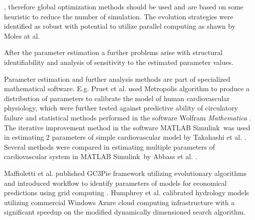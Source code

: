  , therefore global optimization methods should be used and are based on some heuristic to reduce the number of simulation. The evolution strategies were identified as robust with potential to utilize parallel computing as shawn by Moles at al.\cite{Moles2003}

After the parameter estimation a further problems arise with structural identifiability and analysis of sensitivity to the estimated parameter values\cite[p.~176]{khoo2000}. 

Parameter estimation and further analysis methods are part of specialized mathematical software. E.g. Pruet et al. used Metropolis algorithm to produce a distribution of parameters to calibrate the model of human cardiovascular physiology, which were further tested against predictive ability of circulatory failure and statistical methods performed in the software Wolfram \textit{Mathematica} \cite{Pruett2013}. The iterative improvement method in the software MATLAB Simulink\textregistered ~was used in estimating 2 parameters of simple cardiovascular model by Takahashi et al. \cite{Takahashi2013}. Several methods were compared in estimating multiple parameters of cardiovascular system in MATLAB Simulink\textregistered ~by Abbass et al. \cite{Abbass2012}.

Maffioletti et al. published GC3Pie framework utilizing evolutionary algorithms and introduced workflow to identify parameters of models for economical predictions using grid computing \cite{maffioletti2012computational}. Humphrey et al. calibrated hydrology models utilizing commercial Windows Azure cloud computing infrastructure with a significant speedup on the modified dynamically dimensioned search algorithm\cite{Humphrey2012,Tolson2007}. 




